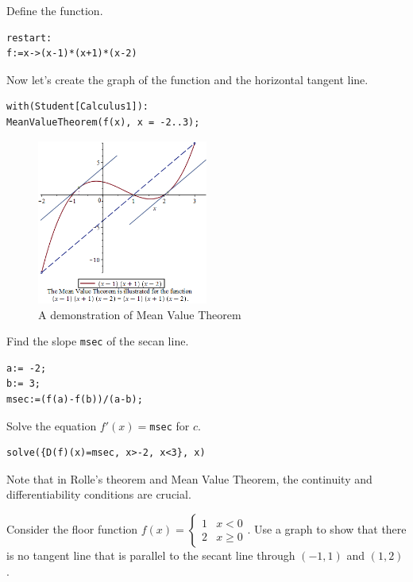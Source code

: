 \documentclass[
  en,11pt,simple]{elegantbook}
\renewenvironment{example}[1][]{
  \refstepcounter{exam}
  \par\noindent\textbf{\color{main}{\examplename} \theexam #1}
  \rmfamily
}{
  \par\ignorespacesafterend
}
\begin{document}
\begin{solution}
{}
Define the function.

\begin{verbatim}
restart:
f:=x->(x-1)*(x+1)*(x-2)
\end{verbatim}

Now let's create the graph of the function and the horizontal tangent line.

\begin{verbatim}
with(Student[Calculus1]):
MeanValueTheorem(f(x), x = -2..3);
\end{verbatim}

\begin{figure}
\centering
\includegraphics[width=0.5\textwidth,height=\textheight]{figs/MeanValueTheorem.png}
\caption{A demonstration of Mean Value Theorem}
\end{figure}

Find the slope \texttt{msec} of the secan line.

\begin{verbatim}
a:= -2;
b:= 3;
msec:=(f(a)-f(b))/(a-b);
\end{verbatim}

Solve the equation \(f'(x)=\)\texttt{msec} for \(c\).

\begin{verbatim}
solve({D(f)(x)=msec, x>-2, x<3}, x)
\end{verbatim}
\end{solution}

Note that in Rolle's theorem and Mean Value Theorem, the continuity and differentiability conditions are crucial.

\begin{example}

Consider the floor function \(f(x)=\begin{cases}1 & x<0\\ 2& x\ge 0\end{cases}\). Use a graph to show that there is no tangent line that is parallel to the secant line through \((-1, 1)\) and \((1,2)\).
\end{example}
\end{document}
